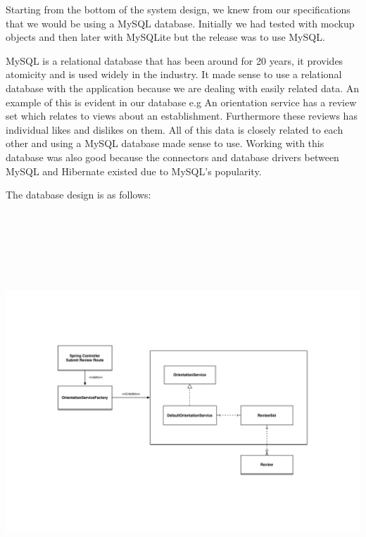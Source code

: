 Starting from the bottom of the system design, we knew from our specifications that we would be using a MySQL database. Initially we had tested with mockup objects and then later with MySQLite but the release was to use MySQL. \newline 

\noindent MySQL is a relational database that has been around for 20 years, it provides atomicity and is used widely in the industry. It made sense to use a relational database with the application because we are dealing with easily related data. An example of this is evident in our database e.g An orientation service has a review set which relates to views about an establishment. Furthermore these reviews has individual likes and dislikes on them. All of this data is closely related to each other and using a MySQL database made sense to use. Working with this database was also good because the connectors and database drivers between MySQL and Hibernate existed due to MySQL's popularity. \newline

\noindent The database design is as follows:

\begin{center}    
	\includegraphics[height=15cm, width=15cm]{img/objectModel.png}
\end{center}

